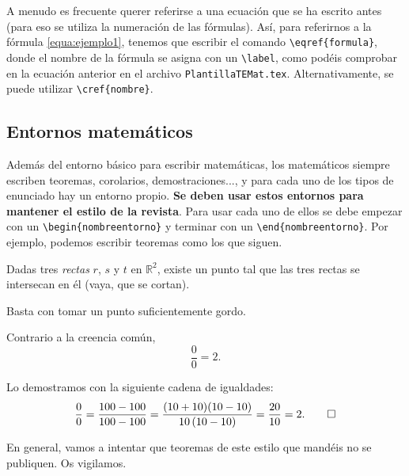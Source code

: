 \documentclass[bibtex]{TEMat-article}
\begin{document}
A menudo es frecuente querer referirse a una ecuación que se ha escrito antes (para eso se utiliza la numeración de las fórmulas).
Así, para referirnos a la fórmula \eqref{equa:ejemplo1}, tenemos que escribir el comando \verb+\eqref{formula}+, donde el nombre de la fórmula se asigna con un \verb+\label+, como podéis comprobar en la ecuación anterior en el archivo \verb+PlantillaTEMat.tex+.
Alternativamente, se puede utilizar \verb+\cref{nombre}+.

\subsection{Entornos matemáticos}

Además del entorno básico para escribir matemáticas, los matemáticos siempre escriben teoremas, corolarios, demostraciones..., y para cada uno de los tipos de enunciado hay un entorno propio.
\textbf{Se deben usar estos entornos para mantener el estilo de la revista}.
Para usar cada uno de ellos se debe empezar con un \verb+\begin{nombreentorno}+ y terminar con un \verb+\end{nombreentorno}+.
Por ejemplo, podemos escribir teoremas como los que siguen.

\begin{teorema}\label{teor:ejemplo1}
Dadas tres \emph{rectas} $r$,\/ $s$ y\/ $t$ en\/ $\mathbb{R}^2$, existe un punto tal que las tres rectas se intersecan en él (vaya, que se cortan).
\end{teorema}

\begin{demostracion}
Basta con tomar un punto suficientemente gordo.
\end{demostracion}

\begin{teorema}\label{teor:ejemplo2}
Contrario a la creencia común,
\[\frac{0}{0}=2.\]
\end{teorema}

\begin{demostracion}
Lo demostramos con la siguiente cadena de igualdades:
\[\frac{0}{0}=\frac{100-100}{100-100}=\frac{(10+10)(10-10)}{10\,(10-10)}=\frac{20}{10}=2.\qedhere\]
\end{demostracion}

\begin{nota*}
En general, vamos a intentar que teoremas de este estilo que mandéis no se publiquen. Os vigilamos.
\end{nota*}
\end{document}
